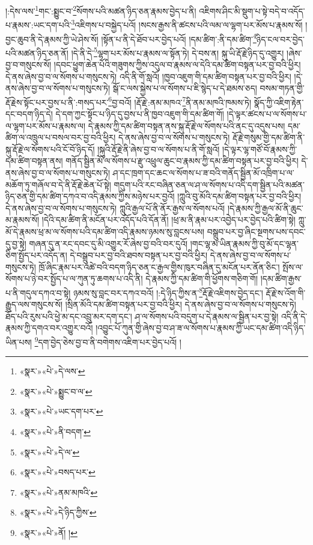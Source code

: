 །:དེས་ལས་\footnote{«སྣར་»«པེ་»དེ་ལས་}གང་:སྨྱུང་བ་\footnote{«སྣར་»«པེ་»སྨྱུང་བ་ལ་}སོགས་པའི་མཚན་ཉིད་ཅན་རྣམས་བྱེད་པ་ནི། འཇིགས་ཤིང་མི་སྡུག་པ་སྟེ་བདེ་བ་འདོད་པ་རྣམས་:ཡང་དག་པའི་\footnote{«སྣར་»«པེ་»ཡང་དག་པར་}འཇིགས་པ་བསྐྱེད་པའོ། །སངས་རྒྱས་ནི་ཚངས་པའི་ལམ་ལ་ལྷག་པར་མོས་པ་རྣམས་སོ། །བྱང་ཆུབ་ནི་དེ་རྣམས་ཀྱི་ཡེ་ཤེས་སོ། །སྟོན་པ་ནི་དེ་ཐོབ་པར་བྱེད་པའོ། །དམ་ཚིག་:ནི་དམ་ཚིག་\footnote{«སྣར་»«པེ་»ནི་བདག་}ཉིད་ངལ་བར་བྱེད་པའི་མཚན་ཉིད་ཅན་ནོ། །དེ་ནི་དེ་\footnote{«སྣར་»«པེ་»དེ་ལ་}ལྷག་པར་མོས་པ་རྣམས་ལ་སྟོན་ཏེ། དེ་བས་ན། སྐུ་ཡི་རྡོ་རྗེ་ཉིད་དུ་འགྱུར། །ཞེས་བྱ་བ་གསུངས་སོ། །དབང་ཕྱུག་ཆེན་པོའི་གཟུགས་ཀྱིས་འདུལ་བ་རྣམས་ལ་དེའི་དམ་ཚིག་བསྟན་པར་བྱ་བའི་ཕྱིར། དེ་ནས་ཞེས་བྱ་བ་ལ་སོགས་པ་གསུངས་ཏེ། འདི་ནི་གོ་སླའོ། །ཁྱབ་འཇུག་གི་དམ་ཚིག་བསྟན་པར་བྱ་བའི་ཕྱིར། །དེ་ནས་ཞེས་བྱ་བ་ལ་སོགས་པ་གསུངས་ཏེ། སྒོ་ང་ལས་སྐྱེས་པ་ལ་སོགས་པ་ཇི་སྙེད་པ་དེ་ཐམས་ཅད། བསམ་གཏན་གྱི་རྡོ་རྗེས་སྟོང་པར་བྱས་པ་ནི་:གསད་པར་\footnote{«སྣར་»«པེ་»བསད་པར་}བྱ་བའོ། །རྡོ་རྗེ་:ནམ་མཁའ་\footnote{«སྣར་»«པེ་»ནམ་མཁའི་}ནི་ནམ་མཁའི་ཁམས་ཏེ། སྣོད་ཀྱི་འཇིག་རྟེན་དང་བདག་ཉིད་དེ། དེ་དག་ཀྱང་སྟོང་པ་ཉིད་དུ་བྱས་པ་ནི་ཁྱབ་འཇུག་གི་དམ་ཚིག་གོ། །དེ་ལྟར་ཚངས་པ་ལ་སོགས་པ་ལ་ལྷག་པར་མོས་པ་རྣམས་ལ། དེ་རྣམས་ཀྱི་དམ་ཚིག་བསྟན་ནས་སྐུ་རྡོ་རྗེ་ལ་སོགས་པའི་ནང་དུ་འདུས་པས། དམ་ཚིག་ལ་འཁྲུལ་པ་བསལ་བར་བྱ་བའི་ཕྱིར། དེ་ནས་ཞེས་བྱ་བ་ལ་སོགས་པ་གསུངས་ཏེ། རྡོ་རྗེ་གསུམ་གྱི་དམ་ཚིག་ནི་སྐུ་རྡོ་རྗེ་ལ་སོགས་པའི་ངོ་བོ་ཉིད་དོ། །སྐུའི་རྡོ་རྗེ་ནི་ཞེས་བྱ་བ་ལ་སོགས་པ་ནི་གོ་སླའོ། །དེ་ལྟར་ལྷ་གཙོ་བོ་རྣམས་ཀྱི་དམ་ཚིག་བསྟན་ནས། གནོད་སྦྱིན་མོ་ལ་སོགས་པ་རྫུ་འཕྲུལ་ཆུང་བ་རྣམས་ཀྱི་དམ་ཚིག་བསྟན་པར་བྱ་བའི་ཕྱིར། དེ་ནས་ཞེས་བྱ་བ་ལ་སོགས་པ་གསུངས་ཏེ། ཤ་དང་ཁྲག་དང་ཆང་ལ་སོགས་པ་ཟ་བའི་གནོད་སྦྱིན་མོ་འཁྲིག་པ་ལ་མཆོག་ཏུ་གཞོལ་བ་དེ་ནི་རྡོ་རྗེ་ཆེན་པོ་སྟེ། གདུག་པའི་རང་བཞིན་ཅན་ལ་ཤ་ལ་སོགས་པ་འདི་དག་སྦྱིན་པའི་མཚན་ཉིད་ཅན་གྱི་དམ་ཚིག་དཀའ་བ་འདི་རྣམས་ཀྱིས་མཉེས་པར་བྱའོ། །ཀླུའི་བུ་མོའི་དམ་ཚིག་བསྟན་པར་བྱ་བའི་ཕྱིར། དེ་ནས་ཞེས་བྱ་བ་ལ་སོགས་པ་གསུངས་ཏེ། ཀླུའི་རྒྱལ་པོ་ནི་ནོར་རྒྱས་ལ་སོགས་པའོ། །དེ་རྣམས་ཀྱི་རྒྱལ་མོ་ནི་ཆུང་མ་རྣམས་སོ། །དེའི་དམ་ཚིག་ནི་མངོན་པར་འདོད་པའི་དོན་ནོ། །ཕྲ་མ་ནི་རྣམ་པར་འབྱེད་པར་བྱེད་པའི་ཚིག་སྟེ། ཀླུ་མོ་དེ་རྣམས་ཕྲ་མ་ལ་སོགས་པའི་དམ་ཚིག་འདི་རྣམས་ཉམས་སུ་བླངས་པས། བསྒྲུབ་པར་བྱ་ཞིང་སྔགས་པས་དབང་དུ་བྱ་སྟེ། གཞན་དུ་ན་རང་དབང་དུ་མི་འགྱུར་རོ་ཞེས་བྱ་བའི་བར་དུའོ། །གང་ལྷ་མ་ཡིན་རྣམས་ཀྱི་བུ་མོ་དང་ལྷན་ཅིག་སྤྱོད་པར་འདོད་ན། དེ་བསྒྲུབ་པར་བྱ་བའི་ཐབས་བསྟན་པར་བྱ་བའི་ཕྱིར། དེ་ནས་ཞེས་བྱ་བ་ལ་སོགས་པ་གསུངས་ཏེ། ཁྲོ་ཞིང་རྣམ་པར་འཚེ་བའི་བདག་ཉིད་ཅན་ང་རྒྱལ་གྱིས་ཁུར་བཞིན་དུ་མངོན་པར་ནོན་ཅིང་། སྤོས་ལ་སོགས་པ་ཉེ་བར་སྤྱོད་པ་ལ་ཀུན་ཏུ་ཆགས་པ་འདི་ནི། དེ་རྣམས་ཀྱི་དམ་ཚིག་གི་ཕྱོགས་གཅིག་གོ། །དམ་ཚིག་རྒྱས་པ་ནི་གདུལ་དཀའ་བ་སྟེ། ཉམས་སུ་བླང་བར་དཀའ་བའོ། །:དེ་ཉིད་ཀྱིས་ན་\footnote{«སྣར་»«པེ་»དེ་ཉིད་ཀྱིས་}རྡོ་རྗེ་འཇིགས་བྱེད་དང་། རྡོ་རྗེ་ས་འོག་གི་རྒྱུད་ལས་གསུངས་སོ། །སྲིན་མོའི་དམ་ཚིག་བསྟན་པར་བྱ་བའི་ཕྱིར། དེ་ནས་ཞེས་བྱ་བ་ལ་སོགས་པ་གསུངས་ཏེ། ཐོད་པའི་རུས་པའི་ཕྱེ་མ་དང་འབྲུ་མར་དག་དང་། ཤ་ལ་སོགས་པའི་བདུག་པ་དེ་རྣམས་ལ་སྦྱིན་པར་བྱ་སྟེ། འདི་ནི་དེ་རྣམས་ཀྱི་དགའ་བར་འགྱུར་བའོ། །འབྱུང་པོ་ཀུན་གྱི་ཞེས་བྱ་བ་ཤ་ཟ་ལ་སོགས་པ་རྣམས་ཀྱི་ཡང་དམ་ཚིག་འདི་ཉིད་ཡིན་པས། \footnote{«སྣར་»«པེ་»ནོ། ། }དག་བྱེད་ཅེས་བྱ་བ་ནི་བགེགས་འཇིག་པར་བྱེད་པའོ། །

